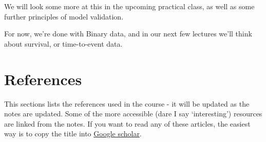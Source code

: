 \documentclass[
  openany]{book}
\theoremstyle{definition}
\theoremstyle{definition}
\theoremstyle{definition}
\theoremstyle{definition}
\theoremstyle{remark}
\begin{document}
We will look some more at this in the upcoming practical class, as well as some further principles of model validation.

For now, we're done with Binary data, and in our next few lectures we'll think about survival, or time-to-event data.

\hypertarget{references}{%
\chapter*{References}\label{references}}

This sections lists the references used in the course - it will be updated as the notes are updated. Some of the more accessible (dare I say `interesting') resources are linked from the notes. If you want to read any of these articles, the easiest way is to copy the title into \href{https://scholar.google.co.uk/}{Google scholar}.

  
\end{document}
